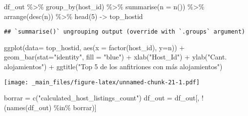 \documentclass[
]{book}
\newenvironment{Shaded}{\begin{snugshade}}{\end{snugshade}}
\newcommand{\AttributeTok}[1]{\textcolor[rgb]{0.77,0.63,0.00}{#1}}
\newcommand{\DecValTok}[1]{\textcolor[rgb]{0.00,0.00,0.81}{#1}}
\newcommand{\FunctionTok}[1]{\textcolor[rgb]{0.00,0.00,0.00}{#1}}
\newcommand{\NormalTok}[1]{#1}
\newcommand{\OtherTok}[1]{\textcolor[rgb]{0.56,0.35,0.01}{#1}}
\newcommand{\SpecialCharTok}[1]{\textcolor[rgb]{0.00,0.00,0.00}{#1}}
\newcommand{\StringTok}[1]{\textcolor[rgb]{0.31,0.60,0.02}{#1}}
\begin{document}
\begin{Shaded}
\begin{Highlighting}[]
\NormalTok{df\_out }\SpecialCharTok{\%\textgreater{}\%}
  \FunctionTok{group\_by}\NormalTok{(host\_id) }\SpecialCharTok{\%\textgreater{}\%}
  \FunctionTok{summarise}\NormalTok{(}\AttributeTok{n =} \FunctionTok{n}\NormalTok{()) }\SpecialCharTok{\%\textgreater{}\%}
  \FunctionTok{arrange}\NormalTok{(}\FunctionTok{desc}\NormalTok{(n)) }\SpecialCharTok{\%\textgreater{}\%}
  \FunctionTok{head}\NormalTok{(}\DecValTok{5}\NormalTok{) }\OtherTok{{-}\textgreater{}}\NormalTok{ top\_hostid}
\end{Highlighting}
\end{Shaded}

\begin{verbatim}
## `summarise()` ungrouping output (override with `.groups` argument)
\end{verbatim}

\begin{Shaded}
\begin{Highlighting}[]
\FunctionTok{ggplot}\NormalTok{(}\AttributeTok{data=}\NormalTok{ top\_hostid, }\FunctionTok{aes}\NormalTok{(}\AttributeTok{x =} \FunctionTok{factor}\NormalTok{(host\_id), }\AttributeTok{y=}\NormalTok{n)) }\SpecialCharTok{+}
  \FunctionTok{geom\_bar}\NormalTok{(}\AttributeTok{stat=}\StringTok{"identity"}\NormalTok{, }\AttributeTok{fill =} \StringTok{"blue"}\NormalTok{) }\SpecialCharTok{+}
  \FunctionTok{xlab}\NormalTok{(}\StringTok{"Host\_Id"}\NormalTok{) }\SpecialCharTok{+} \FunctionTok{ylab}\NormalTok{(}\StringTok{"Cant. alojamientos"}\NormalTok{) }\SpecialCharTok{+}
  \FunctionTok{ggtitle}\NormalTok{(}\StringTok{"Top 5 de los anfitriones con más alojamientos"}\NormalTok{)}
\end{Highlighting}
\end{Shaded}

\texttt{[image: \_main\_files/figure-latex/unnamed-chunk-21-1.pdf]}

\begin{Shaded}
\begin{Highlighting}[]
\NormalTok{borrar }\OtherTok{=} \FunctionTok{c}\NormalTok{(}\StringTok{"calculated\_host\_listings\_count"}\NormalTok{)}
\NormalTok{df\_out }\OtherTok{=}\NormalTok{ df\_out[, }\SpecialCharTok{!}\NormalTok{(}\FunctionTok{names}\NormalTok{(df\_out) }\SpecialCharTok{\%in\%}\NormalTok{ borrar)]}
\end{Highlighting}
\end{Shaded}
\end{document}
